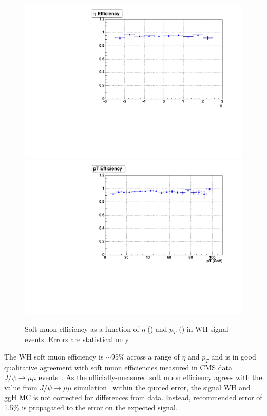 \begin{figure}[hbtp]
  \begin{center}
    \includegraphics[width=\cmsFigWidth]{figures/soft_eta_eff}
    \includegraphics[width=\cmsFigWidth]{figures/soft_pt_eff}
    \caption{Soft muon efficiency as a function of $\eta$ (\cmsLeft) and $p_T$ (\cmsRight) in WH signal events. Errors are statistical only.}
    \label{fig:soft_muon}
  \end{center}
\end{figure}

The WH soft muon efficiency is $\sim$95\% across a range of $\eta$ and $p_T$ and is in good qualitative agreement with soft muon efficiencies measured in CMS data $J\slash\psi\rightarrow\mu\mu$ events~\cite{1748-0221-7-10-P10002}.  As the officially-measured soft muon efficiency agrees with the value from $J\slash\psi\rightarrow\mu\mu$ simulation~\cite{CMS:muonrefeffstwiki} within the quoted error, the signal WH and ggH MC is not corrected for differences from data.  Instead, recommended error of 1.5\% is propagated to the error on the expected signal.

